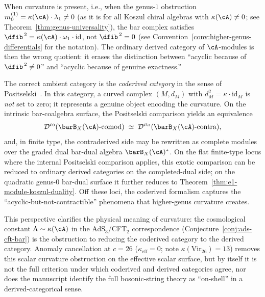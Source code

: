 \begin{remark}\label{rem:curvature-coderived}
When curvature is present, i.e., when the genus-$1$ obstruction
$m_0^{(1)} = \kappa(\cA) \cdot \lambda_1 \neq 0$ (as it is for all
Koszul chiral algebras with $\kappa(\cA) \neq 0$; see
Theorem~\ref{thm:genus-universality}), the bar complex satisfies
$\dfib^{\,2} = \kappa(\cA) \cdot \omega_1 \cdot \mathrm{id}$, not $\dfib^{\,2} = 0$
(see Convention~\ref{conv:higher-genus-differentials} for the notation).
The ordinary derived category of $\cA$-modules is then the wrong
quotient: it erases the distinction between ``acyclic because of
$\dfib^{\,2} \neq 0$'' and ``acyclic because of genuine exactness.''

The correct ambient category is the \emph{coderived category}
in the sense of Positselski~\cite{Positselski11}. In this category,
a curved complex $(M, d_M)$ with $d_M^2 = \kappa \cdot \mathrm{id}_M$
is \emph{not} set to zero; it represents a genuine object encoding the
curvature. On the intrinsic bar-coalgebra surface, the
Positselski comparison yields an equivalence
\[
\mathcal{D}^{\mathrm{co}}(\barB_X(\cA)\text{-}\mathrm{comod})
\;\simeq\;
\mathcal{D}^{\mathrm{ctr}}(\barB_X(\cA)\text{-}\mathrm{contra}),
\]
and, in finite type, the contraderived side may be rewritten as
complete modules over the graded dual bar-dual algebra
$\barB_X(\cA)^*$. On the flat finite-type locus where the internal
Positselski comparison applies, this exotic comparison can be reduced
to ordinary derived categories on the completed-dual side; on the
quadratic genus-$0$ bar-dual surface it further reduces to
Theorem~\ref{thm:e1-module-koszul-duality}. Off these loci, the
coderived formalism captures the ``acyclic-but-not-contractible''
phenomena that higher-genus curvature creates.

This perspective clarifies the physical meaning of curvature: the
cosmological constant $\Lambda \sim \kappa(\cA)$ in the AdS$_3$/CFT$_2$
correspondence (Conjecture~\ref{conj:ads-cft-bar}) is the obstruction
to reducing the coderived category to the derived category. Anomaly
cancellation at $c = 26$ ($\kappa_{\mathrm{eff}} = 0$; note $\kappa(\mathrm{Vir}_{26}) = 13$) removes this scalar
curvature obstruction on the effective scalar surface, but by
itself it is not the full criterion under which
coderived and derived categories agree, nor does the manuscript
identify the full bosonic-string theory as ``on-shell'' in a
derived-categorical sense.
\end{remark}

